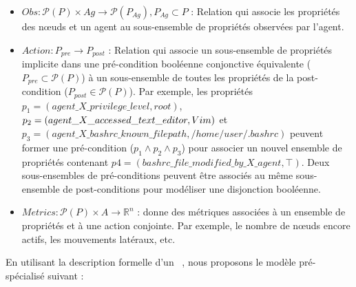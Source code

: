 \begin{itemize}
  \item $Obs : \mathcal{P}(P) \times Ag \rightarrow \mathcal{P}(P_{Ag}), P_{Ag} \subset P$ : Relation qui associe les propriétés des nœuds et un agent au sous-ensemble de propriétés observées par l'agent.



  \item $Action : P_{pre} \rightarrow P_{post}$ : Relation qui associe un sous-ensemble de propriétés implicite dans une pré-condition booléenne conjonctive équivalente ($P_{pre} \subset \mathcal{P}(P)$) à un sous-ensemble de toutes les propriétés de la post-condition ($P_{post} \in \mathcal{P}(P)$). Par exemple, les propriétés $p_1 = (agent\_X\_privilege\_level, \allowbreak root)$, $p_2 = (agent\_X\_acce\-\allowbreak ssed\_text\_editor, \allowbreak Vim)$ et $p_3 = (agent\_X\_bashrc\_known\_filepath, \allowbreak /home/user/ \allowbreak .bashrc)$ peuvent former une pré-condition ($p_1 \land p_2 \land p_3$) pour associer un nouvel ensemble de propriétés contenant $p4 = (bashrc\_file\_modified\_by\_X\_agent, \top)$. Deux sous-ensembles de pré-conditions peuvent être associés au même sous-ensemble de post-conditions pour modéliser une disjonction booléenne.

  \item $Metrics: \mathcal{P}(P) \times A \rightarrow \mathbb{R}^{n}$ : donne des métriques associées à un ensemble de propriétés et à une action conjointe. Par exemple, le nombre de nœuds encore actifs, les mouvements latéraux, etc.

\end{itemize}


En utilisant la description formelle d'un ~\cite{Oliehoek2016}, nous proposons le modèle  pré-spécialisé suivant :

